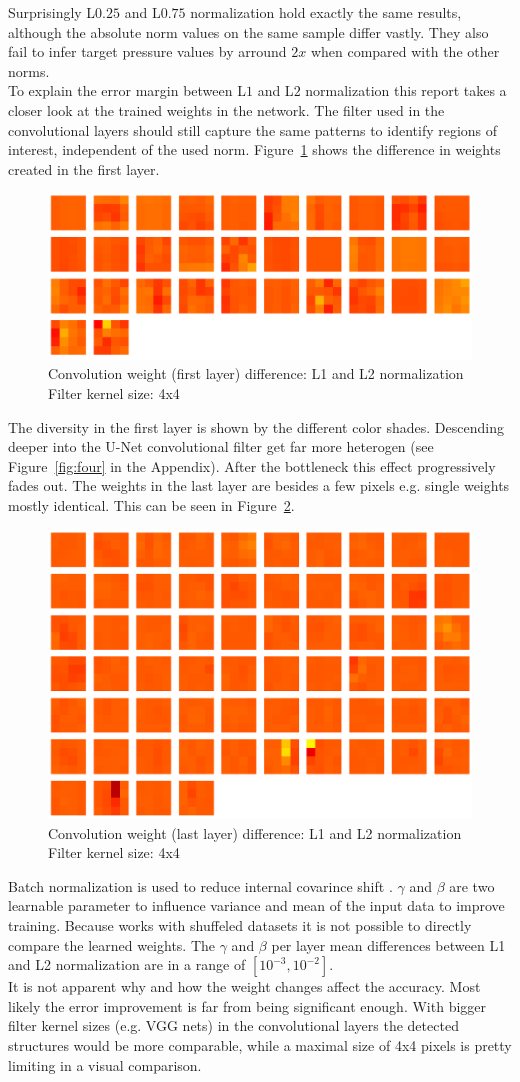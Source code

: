 \documentclass[acmtog]{techreportacmart}
\begin{document}
Surprisingly L$0.25$ and L$0.75$ normalization hold exactly the same results, although the absolute norm values on the same sample differ vastly. They also fail to infer target pressure values by arround $2x$ when compared with the other norms. \\
To explain the error margin between L$1$ and L$2$ normalization this report takes a closer look at the trained weights in the network. The filter used in the convolutional layers should still capture the same patterns to identify regions of interest, independent of the used norm. Figure~\ref{fig:seven} shows the  difference in weights created in the first layer. 

\begin{figure}[H]
  \includegraphics[width=.3\textwidth]{figures/weights_visualized/diff_layer_1_conv.png}
  \caption{Convolution weight (first layer) difference: L1 and L2 normalization \\ Filter kernel size: 4x4}
  \label{fig:seven}
\end{figure}

The diversity in the first layer is shown by the different color shades. Descending deeper into the U-Net convolutional filter get far more heterogen (see Figure~\ref{fig:four} in the Appendix). After the bottleneck this effect progressively fades out. The weights in the last layer are besides a few pixels e.g. single weights mostly identical. This can be seen in Figure~\ref{fig:eight}.

\begin{figure}[H]
  \includegraphics[width=.3\textwidth]{figures/weights_visualized/diff_layer_14_conv.png}
  \caption{Convolution weight (last layer) difference: L1 and L2 normalization \\ Filter kernel size: 4x4}
  \label{fig:eight}
\end{figure}

Batch normalization is used to reduce internal covarince shift \cite{ioffe2015}. 
$\gamma$ and $\beta$ are two learnable parameter to influence variance and mean of the input data to improve training. Because \cite{Thuerey20} works with shuffeled datasets it is not possible to directly compare the learned weights. The $\gamma$ and $\beta$ per layer mean differences between L1 and L2 normalization are in a range of $[10^{-3}, 10^{-2}]$. \\ 
It is not apparent why and how the weight changes affect the accuracy. Most likely the error improvement is far from being significant enough. With bigger filter kernel sizes (e.g. VGG nets) in the convolutional layers the detected structures would be more comparable, while a maximal size of 4x4 pixels is pretty limiting in a visual comparison.
\end{document}

